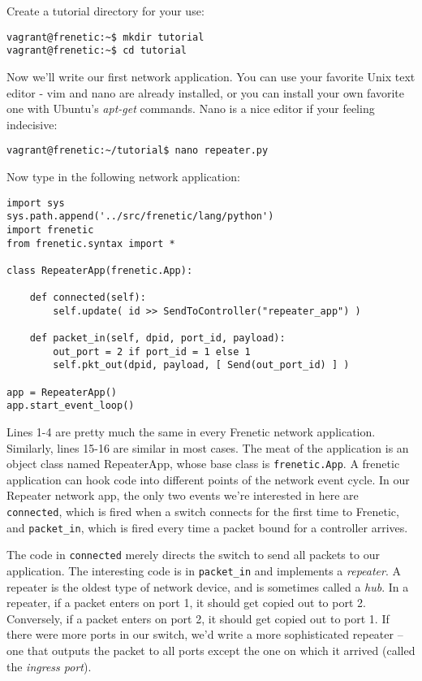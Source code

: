 Create a tutorial directory for your use:

\begin{lstlisting}[style=BashInputStyle]
vagrant@frenetic:~$ mkdir tutorial
vagrant@frenetic:~$ cd tutorial
\end{lstlisting}

Now we'll write our first network application.
You can use your favorite Unix text editor - vim and nano are already installed, or you can install your own favorite
one with Ubuntu's {\it apt-get} commands. 
Nano is a nice editor if your feeling indecisive:

\begin{lstlisting}[style=BashInputStyle]
vagrant@frenetic:~/tutorial$ nano repeater.py
\end{lstlisting}

Now type in the following network application:

\begin{lstlisting}
import sys
sys.path.append('../src/frenetic/lang/python')
import frenetic
from frenetic.syntax import *

class RepeaterApp(frenetic.App):

    def connected(self):
        self.update( id >> SendToController("repeater_app") )

    def packet_in(self, dpid, port_id, payload):
        out_port = 2 if port_id = 1 else 1
        self.pkt_out(dpid, payload, [ Send(out_port_id) ] )

app = RepeaterApp()
app.start_event_loop()
\end{lstlisting}

Lines 1-4 are pretty much the same in every Frenetic network application.
Similarly, lines 15-16 are similar in most cases. 
 The meat of the application is an object class named RepeaterApp, whose base class is \lstinline{frenetic.App}.
A frenetic application can hook code into different points of the network event cycle.
In our Repeater network app, the only two events we're interested in here are
\lstinline{connected}, which is fired when a switch connects for the first time to Frenetic, and 
 \lstinline{packet_in}, which is fired every time a packet
bound for a controller arrives.

The code in \lstinline{connected} merely directs the switch to send all packets to our application.
The interesting code is in \lstinline{packet_in} and implements a {\it repeater}.
A repeater is the oldest type of network device, and is sometimes called a {\it hub}. 
In a repeater, if a packet enters on port 1, it should get copied out to port 2.  
Conversely, if a packet enters on port 2, it should get copied out to port 1.
If there were more ports in our switch, we'd write a more sophisticated repeater -- one that
outputs the packet to all ports except the one on which it arrived (called the {\it ingress port}).  

